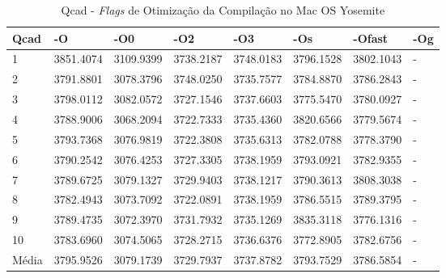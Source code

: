 \begin{apendicesenv}
\begin{table}[!ht]
\centering
\tiny
\caption{Qcad - \textit{Flags} de Otimização da Compilação no Mac OS Yosemite}
\label{tab:otimizacao_compilacao:mac:qcad}
\begin{tabular}{llllllll}
\textbf{Qcad}         & \textbf{-O}  & \textbf{-O0}   & \textbf{-O2} & \textbf{-O3} & \textbf{-Os} & \textbf{-Ofast} & \textbf{-Og} \\ \toprule
1                     & 3851.4074    &   3109.9399    &   3738.2187  &   3748.0183  &   3796.1528  &   3802.1043     &  -           \\ 
2                     & 3791.8801    &   3078.3796    &   3748.0250  &   3735.7577  &   3784.8870  &   3786.2843     &  -           \\ 
3                     & 3798.0112    &   3082.0572    &   3727.1546  &   3737.6603  &   3775.5470  &   3780.0927     &  -           \\ 
4                     & 3788.9006    &   3068.2094    &   3722.7333  &   3735.4360  &   3820.6566  &   3779.5674     &  -           \\ 
5                     & 3793.7368    &   3076.9819    &   3722.3808  &   3735.6313  &   3782.0788  &   3778.3790     &  -           \\ 
6                     & 3790.2542    &   3076.4253    &   3727.3305  &   3738.1959  &   3793.0921  &   3782.9355     &  -           \\ 
7                     & 3789.6725    &   3079.1327    &   3729.9403  &   3738.1217  &   3790.3613  &   3808.3038     &  -           \\ 
8                     & 3782.4943    &   3073.7092    &   3722.0891  &   3738.1959  &   3786.5515  &   3789.3795     &  -           \\ 
9                     & 3789.4735    &   3072.3970    &   3731.7932  &   3735.1269  &   3835.3118  &   3776.1316     &  -           \\ 
10                    & 3783.6960    &   3074.5065    &   3728.2715  &   3736.6376  &   3772.8905  &   3782.6756     &  -           \\ \bottomrule
Média                 & 3795.9526    &   3079.1739    &   3729.7937  &   3737.8782  &   3793.7529  &   3786.5854     &  -           \\ 
\end{tabular}
\end{table}


\end{apendicesenv}
